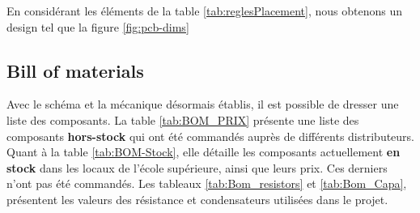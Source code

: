 En considérant les éléments de la table \ref{tab:reglesPlacement}, nous obtenons un design tel que la figure \ref{fig:pcb-dims}

\clearpage

\subsection{Bill of materials} \label{ssec:BOM}
Avec le schéma et la mécanique désormais établis, il est possible de dresser une liste des composants. La table \ref{tab:BOM_PRIX} présente une liste des composants \textbf{hors-stock} qui ont été commandés auprès de différents distributeurs. Quant à la table \ref{tab:BOM-Stock}, elle détaille les composants actuellement \textbf{en stock} dans les locaux de l'école supérieure, ainsi que leurs prix. Ces derniers n'ont pas été commandés. Les tableaux \ref{tab:Bom_resistors} et \ref{tab:Bom_Capa}, présentent les valeurs des résistance et condensateurs utilisées dans le projet.

